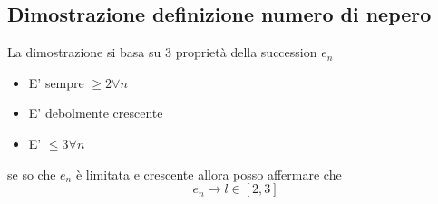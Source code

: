 \subsection{Dimostrazione definizione numero di nepero}
La dimostrazione si basa su 3 proprietà della succession $ e_n$
\begin{itemize}
	\item E' sempre $\ge 2 \forall n$
	\item E' debolmente crescente
	\item E' $\le 3 \forall n$
\end{itemize}
se so che $e_n$ è limitata e crescente allora posso affermare che 
\[
e_n \to l \in \left[ 2,3 \right] 
\] 

